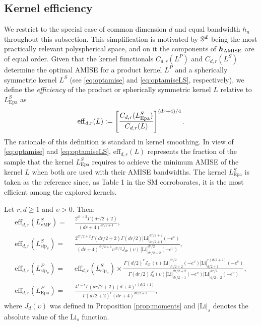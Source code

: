\documentclass[oneside,11pt]{article}
\begin{document}
\subsection{Kernel efficiency}
\label{sec:effiker}

We restrict to the special case of common dimension $d$ and equal bandwidth $h_n$ throughout this subsection. This simplification is motivated by $\mathbb{S}^{\boldsymbol{d}}$ being the most practically relevant polyspherical space, and on it the components of ${\boldsymbol{h}}_{\mathrm{AMISE}}$ are of equal order. Given that the kernel functionals $C_{d,r}(L^P)$ and $C_{d,r}(L^S)$ determine the optimal AMISE for a product kernel $L^P$ and a spherically symmetric kernel $L^S$ (see \eqref{eq:optamise} and \eqref{eq:optamiseLS}, respectively), we define the \emph{efficiency} of the product or spherically symmetric kernel $L$ relative to $L_{\mathrm{Epa}}^S$ as
\begin{align*}
    \mathrm{eff}_{d,r}(L):=\left[\frac{C_{d,r}(L_{\mathrm{Epa}}^S)}{C_{d,r}(L)}\right]^{(dr+4)/4}.
\end{align*}
The rationale of this definition is standard in kernel smoothing. In view of \eqref{eq:optamise} and \eqref{eq:optamiseLS}, $\mathrm{eff}_{d,r}(L)$ represents the fraction of the sample that the kernel $L^S_{\mathrm{Epa}}$ requires to achieve the minimum AMISE of the kernel $L$ when both are used with their AMISE bandwidths. The kernel $L_{\mathrm{Epa}}^S$ is taken as the reference since, as Table 1 in the SM corroborates, it is the most efficient among the explored kernels.

\begin{proposition}\label{cor:effic2}
Let $r,d\geq 1$ and $\upsilon>0$. Then:
\begin{align}
  \mathrm{eff}_{d,r}(L^S_{\mathrm{vMF}})=&\;\frac{2^{dr+2} \Gamma(dr/2+2)}{(dr+4)^{dr/2+1}},\label{eq:eff:vmf}\\
  \mathrm{eff}_{d,r}(L^S_{\mathrm{sfp}_\upsilon})=&\;\frac{2^{dr/2+2}\Gamma(dr/2+2)\Gamma(dr/2)|\mathrm{Li}|^{dr/2+2}_{dr/2+1}(-e^\upsilon)}{(dr+4)^{dr/2+1} \upsilon^{dr/2}J_{dr}(\upsilon) \,|\mathrm{Li}|_{dr/2+2}^{dr/2}(-e^\upsilon)},
  \nonumber\\
  \mathrm{eff}_{d,r}(L^P_{\mathrm{sfp}_\upsilon})=&\;\mathrm{eff}_{d,r}(L_{\mathrm{sfp}_\upsilon}^S) \times \frac{\Gamma(d/2)^rJ_{dr}(\upsilon)|\mathrm{Li}|_{dr/2+2}^{dr/2}(-e^\upsilon)|\mathrm{Li}|_{d/2+1}^{r(d/2+2)}(-e^\upsilon)}{\Gamma(dr/2)J_d^r(\upsilon)|\mathrm{Li}|_{dr/2+1}^{dr/2+2}(-e^\upsilon)|\mathrm{Li}|_{d/2+2}^{dr/2}(-e^\upsilon)},\label{eq:eff:sfpprod}\\
  \mathrm{eff}_{d,r}(L^P_{\mathrm{Epa}})=&\;\frac{4^{1-r}\Gamma(dr/2+2)(d+4)^{r(d/2+1)}}{\Gamma(d/2+2)^r(dr+4)^{dr/2+1}},\label{eq:eff:epa}
\end{align}
where $J_d(\upsilon)$ was defined in Proposition \ref{prop:moments} and $|\mathrm{Li}|_s$ denotes the absolute value of the $\mathrm{Li}_s$ function.
\end{proposition}
\end{document}
